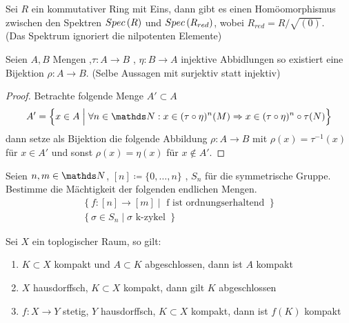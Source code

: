 \documentclass[ngerman, parskip=half, titlepage=false]{scrartcl}
\begin{document}
\begin{Satz}
  Sei $R$ ein kommutativer Ring mit Eins, dann gibt es einen
  Homöomorphismus zwischen den Spektren $Spec \left( R \right)$ und
  $Spec \left( R_{red} \right)$, wobei $R_{red}=R/\sqrt{(0)}$.\\
  (Das Spektrum ignoriert die nilpotenten Elemente)
\end{Satz}

\begin{Satz}
  Seien $A,B$ Mengen ,$\tau : A \rightarrow B$ ,
  $\eta : B \rightarrow A$ injektive Abbidlungen so existiert eine
  Bijektion $\rho : A \rightarrow B$. (Selbe Aussagen mit surjektiv
  statt injektiv)
  \begin{proof}
    Betrachte folgende Menge $A' \subset A$ \\
    \begin{gather*}
      A' = \left\{ x \in A \; \Big| \;  \forall n \in \N : x \in (\tau \circ
        \eta)^n (M) \Rightarrow x \in (\tau \circ \eta)^n \circ
        \tau(N) \right\}
    \end{gather*}
    dann setze als Bijektion die folgende Abbildung
    $\rho : A \rightarrow B$ mit $\rho(x) = \tau^{-1}(x)$ für
    $x \in A'$ und sonst $\rho(x)=\eta(x)$ für $ x \not\in A'$.
  \end{proof}
\end{Satz}


\begin{Auf}
  Seien $n,m \in \N$, $[n] \coloneqq \{ 0,\ldots,n \}$ , $S_n$ für
  die symmetrische Gruppe. Bestimme die Mächtigkeit der folgenden
  endlichen Mengen.
  \begin{gather*}
    \left\{ f: [n] \rightarrow [m] \; | \; \text{ f ist
        ordnungserhaltend }\right\}\\
    \left\{ \sigma \in S_n \; | \; \sigma \text{ k-zykel  }\right\}
  \end{gather*}
\end{Auf}

\begin{Auf}
  Sei $X$ ein toplogischer Raum, so gilt:
  \begin{enumerate}[1)]
  \item $K \subset X$ kompakt und $A \subset K$ abgeschlossen, dann
    ist $A$ kompakt
  \item $X$ hausdorffsch, $K \subset X$ kompakt, dann gilt $K$ abgeschlossen
  \item $f:X \rightarrow Y$ stetig, $Y$ hausdorffsch, $K \subset X$
    kompakt, dann ist $f(K)$ kompakt
  \end{enumerate}
\end{Auf}
\end{document}
